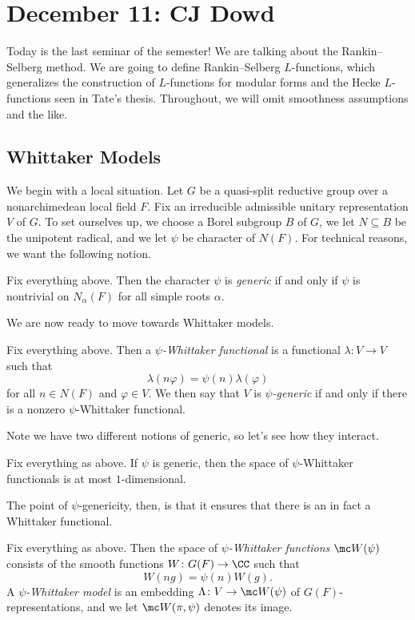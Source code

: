 \documentclass{article}
\begin{document}
\section{December 11: CJ Dowd}
Today is the last seminar of the semester! We are talking about the Rankin--Selberg method. We are going to define Rankin--Selberg $L$-functions, which generalizes the construction of $L$-functions for modular forms and the Hecke $L$-functions seen in Tate's thesis. Throughout, we will omit smoothness assumptions and the like.

\subsection{Whittaker Models}
We begin with a local situation. Let $G$ be a quasi-split reductive group over a nonarchimedean local field $F$. Fix an irreducible admissible unitary representation $V$ of $G$. To set ourselves up, we choose a Borel subgroup $B$ of $G$, we let $N\subseteq B$ be the unipotent radical, and we let $\psi$ be character of $N(F)$. For technical reasons, we want the following notion.
\begin{definition}[generic]
	Fix everything above. Then the character $\psi$ is \textit{generic} if and only if $\psi$ is nontrivial on $N_\alpha(F)$ for all simple roots $\alpha$.
\end{definition}
We are now ready to move towards Whittaker models.
\begin{definition}
	Fix everything above. Then a \textit{$\psi$-Whittaker functional} is a functional $\lambda\colon V\to V$ such that
	\[\lambda(n\varphi)=\psi(n)\lambda(\varphi)\]
	for all $n\in N(F)$ and $\varphi\in V$. We then say that $V$ is \textit{$\psi$-generic} if and only if there is a nonzero $\psi$-Whittaker functional.
\end{definition}
Note we have two different notions of generic, so let's see how they interact.
\begin{theorem}
	Fix everything as above. If $\psi$ is generic, then the space of $\psi$-Whittaker functionals is at most $1$-dimensional.
\end{theorem}
The point of $\psi$-genericity, then, is that it ensures that there is an in fact a Whittaker functional.
\begin{definition}
	Fix everything as above. Then the space of \textit{$\psi$-Whittaker functions} $\mc W(\psi)$ consists of the smooth functions $W\colon G(F)\to\CC$ such that
	\[W(ng)=\psi(n)W(g).\]
	A \textit{$\psi$-Whittaker model} is an embedding $\Lambda\colon V\to\mc W(\psi)$ of $G(F)$-representations, and we let $\mc W(\pi,\psi)$ denotes its image.
\end{definition}
\end{document}
